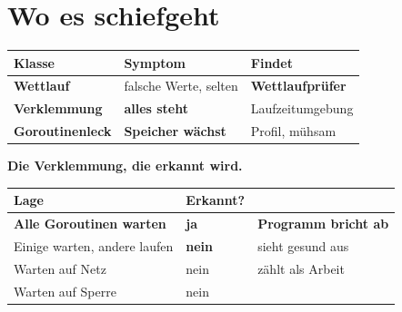 \chapter{Wo es schiefgeht}\label{kap:schiefgeht}

\begin{merksatz}
\begin{center}
{\small
\renewcommand{\arraystretch}{1.5}
\begin{tabular}{@{}P{2.8cm}P{2.6cm}P{2.6cm}@{}}
\toprule
\textbf{Klasse} & \textbf{Symptom} & \textbf{Findet}\\
\midrule
\textbf{Wettlauf} & \textcolor{akzent}{falsche Werte, selten} & \textbf{Wettlaufprüfer}\\
\textbf{Verklemmung} & \textbf{alles steht} & \textcolor{gruen}{Laufzeit\-umgebung}\\
\textbf{Goroutinenleck} & \textcolor{akzent}{\textbf{Speicher wächst}} & \textcolor{akzent}{Profil, mühsam}\\
\bottomrule
\end{tabular}}
\end{center}

\begin{center}
\begin{minipage}{0.88\textwidth}
\end{minipage}
\end{center}

\textbf{Die Verklemmung, die erkannt wird.}

\begin{center}
\renewcommand{\arraystretch}{1.5}
\begin{tabular}{@{}P{3.0cm}P{2.2cm}P{2.8cm}@{}}
\toprule
\textbf{Lage} & \textbf{Erkannt?} & \\
\midrule
\textbf{Alle Goroutinen warten} & \textcolor{gruen}{\textbf{ja}} & \textbf{Programm bricht ab}\\
Einige warten, andere laufen & \textcolor{akzent}{\textbf{nein}} & \textcolor{akzent}{sieht gesund aus}\\
Warten auf Netz & \textcolor{akzent}{nein} & \textcolor{akzent}{zählt als Arbeit}\\
Warten auf Sperre & \textcolor{akzent}{nein} & \\
\bottomrule
\end{tabular}
\end{center}


\end{merksatz}
